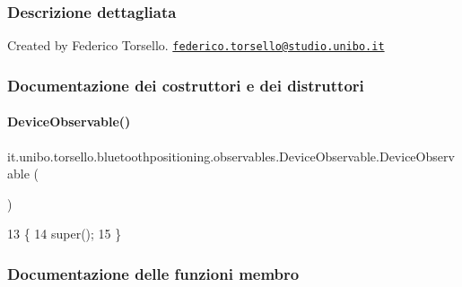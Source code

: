 \subsubsection{Descrizione dettagliata}
Created by Federico Torsello. \href{mailto:federico.torsello@studio.unibo.it}{\tt federico.\+torsello@studio.\+unibo.\+it} 

\subsubsection{Documentazione dei costruttori e dei distruttori}
\hypertarget{classit_1_1unibo_1_1torsello_1_1bluetoothpositioning_1_1observables_1_1DeviceObservable_afd89b681af0ee7708c8d3e830128cd2a_afd89b681af0ee7708c8d3e830128cd2a}{}\label{classit_1_1unibo_1_1torsello_1_1bluetoothpositioning_1_1observables_1_1DeviceObservable_afd89b681af0ee7708c8d3e830128cd2a_afd89b681af0ee7708c8d3e830128cd2a} 
\paragraph{\texorpdfstring{Device\+Observable()}{DeviceObservable()}}
{\footnotesize\ttfamily it.\+unibo.\+torsello.\+bluetoothpositioning.\+observables.\+Device\+Observable.\+Device\+Observable (\begin{DoxyParamCaption}{ }\end{DoxyParamCaption})\hspace{0.3cm}{\ttfamily [private]}}


\begin{DoxyCode}
13                                \{
14         super();
15     \}
\end{DoxyCode}


\subsubsection{Documentazione delle funzioni membro}
\hypertarget{classit_1_1unibo_1_1torsello_1_1bluetoothpositioning_1_1observables_1_1DeviceObservable_ab16792c5848440646624b2a41553954a_ab16792c5848440646624b2a41553954a}{}\label{classit_1_1unibo_1_1torsello_1_1bluetoothpositioning_1_1observables_1_1DeviceObservable_ab16792c5848440646624b2a41553954a_ab16792c5848440646624b2a41553954a} 
